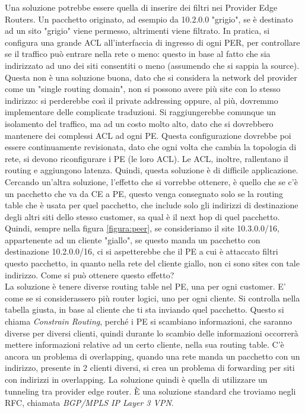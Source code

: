 \documentclass{article}
\begin{document}
Una soluzione potrebbe essere quella di inserire dei filtri nei Provider Edge Routers. Un pacchetto originato, ad esempio da 10.2.0.0 "grigio", se è destinato ad un sito "grigio" viene permesso, altrimenti viene filtrato. In pratica, si configura una grande ACL all'interfaccia di ingresso di ogni PER, per controllare se il traffico può entrare nella rete o meno: questo in base al fatto che sia indirizzato ad uno dei siti consentiti o meno (assumendo che si sappia la source). Questa non è una soluzione buona, dato che si considera la network del provider come un "single routing domain", non si possono avere più site con lo stesso indirizzo: si perderebbe così il private addressing oppure, al più, dovremmo implementare delle complicate traduzioni. Si raggiungerebbe comunque un isolamento del traffico, ma ad un costo molto alto, dato che si dovrebbero mantenere dei complessi ACL ad ogni PE. Questa configurazione dovrebbe poi essere continuamente revisionata, dato che ogni volta che cambia la topologia di rete, si devono riconfigurare i PE (le loro ACL). Le ACL, inoltre, rallentano il routing e aggiungono latenza. Quindi, questa soluzione è di difficile applicazione. \\ Cercando un'altra soluzione, l'effetto che si vorrebbe ottenere, è quello che se c'è un pacchetto che va da CE a PE, questo venga consegnato solo se la routing table che è usata per quel pacchetto, che include solo gli indirizzi di destinazione degli altri siti dello stesso customer, sa qual è il next hop di quel pacchetto. Quindi, sempre nella figura \ref{figura:peer}, se consideriamo il site 10.3.0.0/16, appartenente ad un cliente "giallo", se questo manda un pacchetto con destinazione 10.2.0.0/16, ci si aspetterebbe che il PE a cui è attaccato filtri questo pacchetto, in quanto nella rete del cliente giallo, non ci sono sites con tale indirizzo. Come si può ottenere questo effetto? \\ La soluzione è tenere diverse routing table nel PE, una per ogni customer. E' come se si considerassero più router logici, uno per ogni cliente. Si controlla nella tabella giusta, in base al cliente che ti sta inviando quel pacchetto. Questo si chiama \textit{Constrain Routing}, perché i PE si scambiano informazioni, che saranno diverse per diversi clienti, quindi durante lo scambio delle informazioni occorrerà mettere informazioni relative ad un certo cliente, nella sua routing table. C'è ancora un problema di overlapping, quando una rete manda un pacchetto con un indirizzo, presente in 2 clienti diversi, si crea un problema di forwarding per siti con indirizzi in overlapping. La soluzione quindi è quella di utilizzare un tunneling tra provider edge router. È una soluzione standard che troviamo negli RFC, chiamata \textit{BGP/MPLS IP Layer 3 VPN}.
\end{document}
